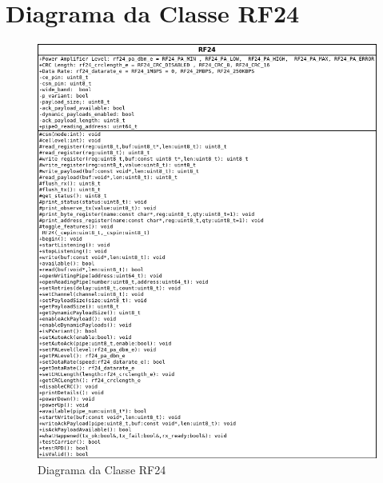\section{Diagrama da Classe RF24}
  \begin{figure}[!htb]
    \centering
    \includegraphics[width=\linewidth]{../../Imagens/RF24_class.png}
    \caption{Diagrama da Classe RF24} %
    \label{RF24_ClassDiag}
  \end{figure}

